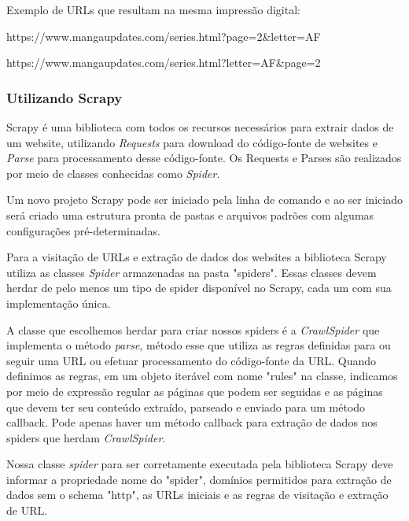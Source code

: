 \documentclass[12pt]{article}
\begin{document}
Exemplo de URLs que resultam na mesma impressão digital:


https://www.mangaupdates.com/series.html?page=2\&letter=AF

https://www.mangaupdates.com/series.html?letter=AF\&page=2


\subsubsection{Utilizando Scrapy}

Scrapy é uma biblioteca com todos os recursos necessários para extrair dados de um website, utilizando \textit{Requests} para download do código-fonte de websites e \textit{Parse} para processamento desse código-fonte. Os Requests e Parses são realizados por meio de classes conhecidas como \textit{Spider}.

Um novo projeto Scrapy pode ser iniciado pela linha de comando e ao ser iniciado será criado uma estrutura pronta de pastas e arquivos padrões com algumas configurações pré-determinadas.\newline 

 

Para a visitação de URLs e extração de dados dos websites a biblioteca Scrapy utiliza as classes \textit{Spider} armazenadas na pasta "spiders". Essas classes devem herdar de pelo menos um tipo de spider disponível no Scrapy, cada um com sua implementação única.

A classe que escolhemos herdar para criar nossos spiders é a \textit{CrawlSpider} que implementa o método \emph{parse}, método esse que utiliza as regras definidas para ou seguir uma URL ou efetuar processamento do código-fonte da URL. Quando definimos as regras, em um objeto iterável com nome "rules" na classe, indicamos por meio de expressão regular as páginas que podem ser seguidas e as páginas que devem ter seu conteúdo extraído, parseado e enviado para um método callback. Pode apenas haver um método callback para extração de dados nos spiders que herdam \textit{CrawlSpider}.

Nossa classe \emph{spider} para ser corretamente executada pela biblioteca Scrapy deve informar a propriedade nome do "spider", domínios permitidos para extração de dados sem o schema "http", as URLs iniciais e as regras de visitação e extração de URL.
\end{document}

